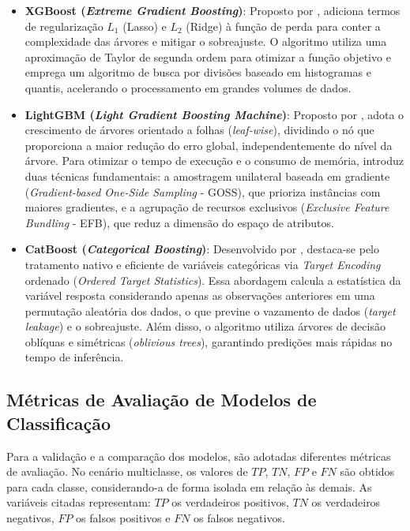\begin{itemize}
	\item \textbf{XGBoost (\textit{Extreme Gradient Boosting})}: Proposto por , adiciona termos de regularização $L_1$ (Lasso) e $L_2$ (Ridge) à função de perda para conter a complexidade das árvores e mitigar o sobreajuste. O algoritmo utiliza uma aproximação de Taylor de segunda ordem para otimizar a função objetivo e emprega um algoritmo de busca por divisões baseado em histogramas e quantis, acelerando o processamento em grandes volumes de dados.
	
	\item \textbf{LightGBM (\textit{Light Gradient Boosting Machine})}: Proposto por , adota o crescimento de árvores orientado a folhas (\textit{leaf-wise}), dividindo o nó que proporciona a maior redução do erro global, independentemente do nível da árvore. Para otimizar o tempo de execução e o consumo de memória, introduz duas técnicas fundamentais: a amostragem unilateral baseada em gradiente (\textit{Gradient-based One-Side Sampling} - GOSS), que prioriza instâncias com maiores gradientes, e a agrupação de recursos exclusivos (\textit{Exclusive Feature Bundling} - EFB), que reduz a dimensão do espaço de atributos.
	
	\item \textbf{CatBoost (\textit{Categorical Boosting})}: Desenvolvido por , destaca-se pelo tratamento nativo e eficiente de variáveis categóricas via \textit{Target Encoding} ordenado (\textit{Ordered Target Statistics}). Essa abordagem calcula a estatística da variável resposta considerando apenas as observações anteriores em uma permutação aleatória dos dados, o que previne o vazamento de dados (\textit{target leakage}) e o sobreajuste. Além disso, o algoritmo utiliza árvores de decisão oblíquas e simétricas (\textit{oblivious trees}), garantindo predições mais rápidas no tempo de inferência.
\end{itemize}

\subsection{Métricas de Avaliação de Modelos de Classificação}

Para a validação e a comparação dos modelos, são adotadas diferentes métricas de avaliação. No cenário multiclasse, os valores de $TP$, $TN$, $FP$ e $FN$ são obtidos para cada classe, considerando-a de forma isolada em relação às demais. As variáveis citadas representam: $TP$ os verdadeiros positivos, $TN$ os verdadeiros negativos, $FP$ os falsos positivos e $FN$ os falsos negativos.


